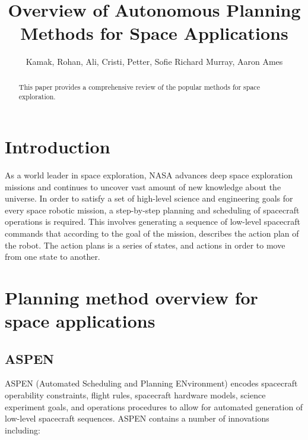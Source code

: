 \documentclass[conference]{IEEEtran}
\begin{document}

\title{\huge Overview of Autonomous Planning Methods for Space Applications}

\author{Kamak, Rohan, Ali, Cristi, Petter, Sofie Richard Murray, Aaron Ames}

\maketitle


\begin{abstract}
This paper provides a comprehensive review of the popular methods for space exploration.
\end{abstract}


\IEEEpeerreviewmaketitle


\section{Introduction}
As a world leader in space exploration, NASA advances deep space exploration missions and continues to uncover vast amount of new knowledge about the universe.
In order to satisfy a set of high-level science and engineering goals for every space robotic mission, a step-by-step planning and scheduling of spacecraft operations is required. This involves generating a sequence of low-level spacecraft commands that according to the goal of the mission, describes the action plan of the robot. The action plans is a series of states, and actions in order to move from one state to another.


\section{Planning method overview for space applications}

\subsection{ASPEN}\label{sec:aspen}
ASPEN (Automated Scheduling and Planning ENvironment) encodes spacecraft operability constraints, flight rules, spacecraft hardware models, science experiment goals, and operations procedures to allow for automated generation of low-level spacecraft sequences. ASPEN contains a number of innovations including: 
\end{document}
